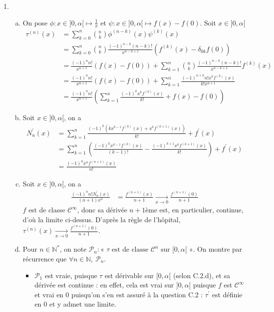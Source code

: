 \documentclass[17pt]{article}
\def\N{\mathbb N}
\def\Cinf{\mathcal{C}^{\infty}}
\begin{document}
\begin{enumerate}
\begin{enumerate}[a)]
		\end{enumerate}
		\item 
		\begin{enumerate}[a)]
			\item On pose $\phi:x\in]0,\alpha[\mapsto \frac1x$ et $\psi:x\in]0,\alpha[\mapsto f(x)-f(0)$. Soit $x\in]0,\alpha[$ 
			\begin{align*}
				\tau^{(n)}(x) &=\sum_{k=0}^n\binom nk\phi^{(n-k)}(x)\psi^{(k)}(x)\\
							  &=\sum_{k=0}^n\binom nk\frac{(-1)^{n-k}(n-k)!}{x^{n-k+1}}(f^{(k)}(x)-\delta_{0k}f(0))\\
							  &=\frac{(-1)^nn!}{x^{n+1}}(f(x)-f(0))+\sum_{k=1}^n\binom nk\frac{(-1)^{n-k}(n-k)!}{x^{n-k+1}}f^{(k)}(x)\\
							  &=\frac{(-1)^nn!}{x^{n+1}}(f(x)-f(0))+\sum_{k=1}^n\frac{(-1)^{n+k}n!x^kf^{(k)}(x)}{k!x^{n+1}}\\
							  &=\frac{(-1)^nn!}{x^{n+1}}\left(\sum_{k=1}^n\frac{(-1)^kx^kf^{(k)}(x)}{k!}+f(x)-f(0)\right)
			\end{align*}
			\item Soit $x\in]0,\alpha[$, on a 
			\begin{align*}
				N_n^\prime(x) &= \sum_{k=1}^n\frac{(-1)^k(kx^{k-1}f^{(k)}(x)+x^kf^{(k+1)}(x))}{k!}+f^\prime(x)\\
							  &= \sum_{k=1}^n\left(\frac{(-1)^kx^{k-1}f^{(k)}(x)}{(k-1)!}-\frac{(-1)^{k+1}x^kf^{(k+1)}(x)}{k!}\right)+f^\prime(x)\\
							  &= \frac{(-1)^nx^nf^{(n+1)}(x)}{n!}
			\end{align*}
			\item Soit $x\in]0,\alpha[$, on a 
			\begin{align*}
				\frac{(-1)^nn!N_n^\prime(x)}{(n+1)x^n} &= \frac{f^{(n+1)}(x)}{n+1}\xrightarrow[x\to 0]{} \frac{f^{(n+1)}(0)}{n+1}
			\end{align*}
			$f$ est de classe $\Cinf$, donc sa dérivée $n+1$ème est, en particulier, continue, d'où la limite ci-dessus. D'après la règle de l'hôpital, $\tau^{(n)}(x)\xrightarrow[x\to 0]{} \frac{f^{(n+1)}(0)}{n+1}$.
			\item Pour $n\in\N^*$, on note $\mathcal{P}_n:\text{« }\tau\text{ est de classe }\mathcal C^n\text{ sur }[0,\alpha[\text{ »}$. On montre par récurrence que $\forall n\in\N,\ \mathcal{P}_n$.
			\begin{itemize}
				\item $\mathcal P_1$ est vraie, puisque $\tau$ est dérivable sur $[0,\alpha[$ (selon C.2.d), et sa dérivée est continue : en effet, cela est vrai sur $]0,\alpha[$ puisque $f$ est $\Cinf$ et vrai en $0$ puisqu'on s'en est assuré à la question C.2 : $\tau^\prime$ est définie en $0$ et y admet une limite. 

\end{itemize}
\end{enumerate}
\end{enumerate}
\end{document}
